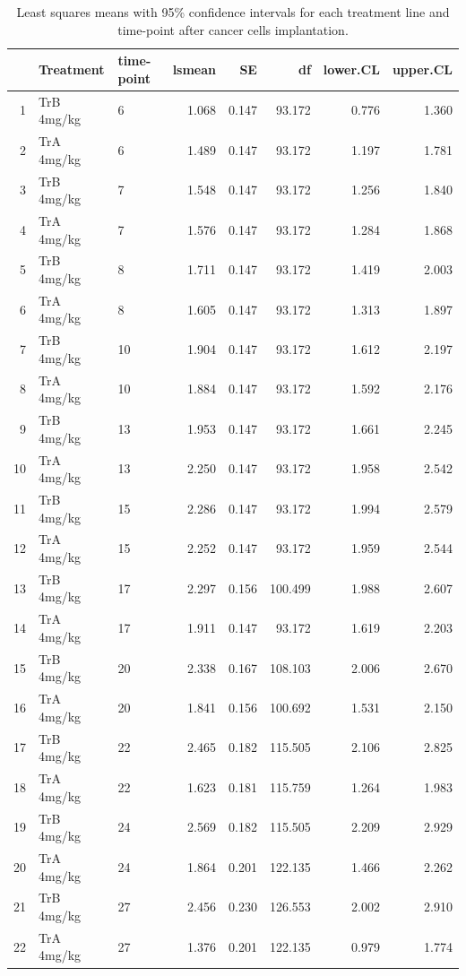 \begin{table}
	\centering
	\begin{tabular}{rllrrrrr}
		\hline
		   & Treatment  & time-point & lsmean & SE    & df      & lower.CL & upper.CL \\
		\hline
		1  & TrB 4mg/kg & 6         & 1.068  & 0.147 & 93.172  & 0.776    & 1.360    \\
		2  & TrA 4mg/kg & 6         & 1.489  & 0.147 & 93.172  & 1.197    & 1.781    \\
		3  & TrB 4mg/kg & 7         & 1.548  & 0.147 & 93.172  & 1.256    & 1.840    \\
		4  & TrA 4mg/kg & 7         & 1.576  & 0.147 & 93.172  & 1.284    & 1.868    \\
		5  & TrB 4mg/kg & 8         & 1.711  & 0.147 & 93.172  & 1.419    & 2.003    \\
		6  & TrA 4mg/kg & 8         & 1.605  & 0.147 & 93.172  & 1.313    & 1.897    \\
		7  & TrB 4mg/kg & 10        & 1.904  & 0.147 & 93.172  & 1.612    & 2.197    \\
		8  & TrA 4mg/kg & 10        & 1.884  & 0.147 & 93.172  & 1.592    & 2.176    \\
		9  & TrB 4mg/kg & 13        & 1.953  & 0.147 & 93.172  & 1.661    & 2.245    \\
		10 & TrA 4mg/kg & 13        & 2.250  & 0.147 & 93.172  & 1.958    & 2.542    \\
		11 & TrB 4mg/kg & 15        & 2.286  & 0.147 & 93.172  & 1.994    & 2.579    \\
		12 & TrA 4mg/kg & 15        & 2.252  & 0.147 & 93.172  & 1.959    & 2.544    \\
		13 & TrB 4mg/kg & 17        & 2.297  & 0.156 & 100.499 & 1.988    & 2.607    \\
		14 & TrA 4mg/kg & 17        & 1.911  & 0.147 & 93.172  & 1.619    & 2.203    \\
		15 & TrB 4mg/kg & 20        & 2.338  & 0.167 & 108.103 & 2.006    & 2.670    \\
		16 & TrA 4mg/kg & 20        & 1.841  & 0.156 & 100.692 & 1.531    & 2.150    \\
		17 & TrB 4mg/kg & 22        & 2.465  & 0.182 & 115.505 & 2.106    & 2.825    \\
		18 & TrA 4mg/kg & 22        & 1.623  & 0.181 & 115.759 & 1.264    & 1.983    \\
		19 & TrB 4mg/kg & 24        & 2.569  & 0.182 & 115.505 & 2.209    & 2.929    \\
		20 & TrA 4mg/kg & 24        & 1.864  & 0.201 & 122.135 & 1.466    & 2.262    \\
		21 & TrB 4mg/kg & 27        & 2.456  & 0.230 & 126.553 & 2.002    & 2.910    \\
		22 & TrA 4mg/kg & 27        & 1.376  & 0.201 & 122.135 & 0.979    & 1.774    \\
		\hline
	\end{tabular}
	\caption{Least squares means with 95\% confidence intervals for each treatment line and time-point after cancer cells implantation.}
	\label{effects_LME_factor_TrA_baseline_TrB}
\end{table}


